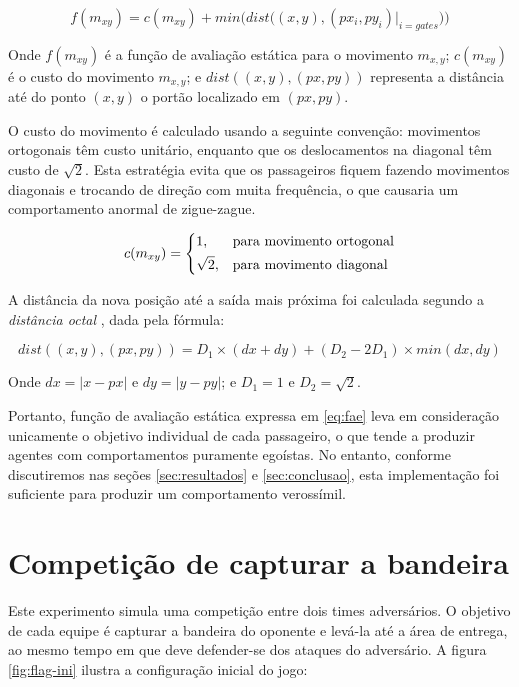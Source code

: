 \documentclass[preprint,12pt]{elsarticle}
\begin{document}
\begin{equation}
f(m_{xy}) = c(m_{xy}) + min\Big(dist\big((x, y), (px_i, py_i)|_{i=gates}\big)\Big)
\label{eq:fae}
\end{equation}

Onde $f(m_{xy})$ é a função de avaliação estática para o movimento $m_{x, y}$; $c(m_{xy})$ é o custo do movimento $m_{x, y}$; e $dist((x, y), (px, py))$ representa a distância até do ponto $(x, y)$ o portão localizado em $(px, py)$.

O custo do movimento é calculado usando a seguinte convenção: movimentos ortogonais têm custo unitário, enquanto que os deslocamentos na diagonal têm custo de $\sqrt{2}$. Esta estratégia evita que os passageiros fiquem fazendo movimentos diagonais e trocando de direção com muita frequência, o que causaria um comportamento anormal de zigue-zague.

\begin{equation}
c(m_{xy})= 
\begin{dcases}
	1,			& \text{para movimento ortogonal}\\
	\sqrt{2},   & \text{para movimento diagonal}
\end{dcases}
\end{equation}


A distância da nova posição até a saída mais próxima foi calculada segundo a \textit{distância octal} \cite{amit2017pathfind}, dada pela fórmula:

\begin{equation}
dist((x, y), (px, py)) = D_1\times(dx + dy) + (D_2 - 2D_1)\times min(dx, dy)
\end{equation}

Onde $dx = |x - px|$ e $dy = |y - py|$; e $D_1 = 1$ e $D_2 = \sqrt{2}$.

Portanto, função de avaliação estática expressa em \ref{eq:fae} leva em consideração unicamente o objetivo individual de cada passageiro, o que tende a produzir agentes com comportamentos puramente egoístas. No entanto, conforme discutiremos nas seções \ref{sec:resultados} e \ref{sec:conclusao}, esta implementação foi suficiente para produzir um comportamento verossímil.

\section{Competição de capturar a bandeira}
\label{sec:sim2}

Este experimento simula uma competição entre dois times adversários. O objetivo de cada equipe é capturar a bandeira do oponente e levá-la até a área de entrega, ao mesmo tempo em que deve defender-se dos ataques do adversário. A figura \ref{fig:flag-ini} ilustra a configuração inicial do jogo:
\end{document}
